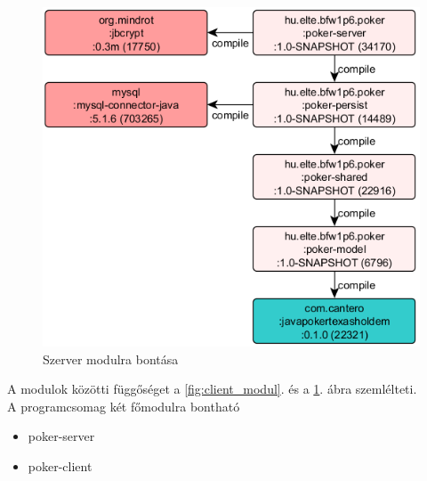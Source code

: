 \begin{figure}[h!]
	\caption{Szerver modulra bontása}
	\label{fig:server_modul}
	\centering
	\includegraphics{user-documentation/images/poker-server-deps.png}
\end{figure}
A modulok közötti függőséget a \ref{fig:client_modul}. és a \ref{fig:server_modul}. ábra szemlélteti. \\
A programcsomag két főmodulra bontható
\begin{itemize}[leftmargin=2.7cm]
\item poker-server
\item poker-client
\end{itemize}


